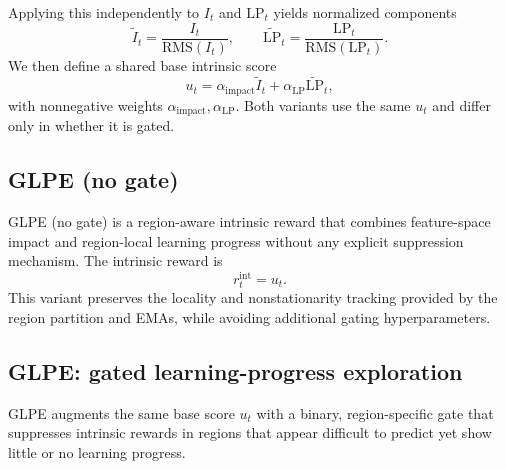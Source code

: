 Applying this independently to $I_t$ and $\mathrm{LP}_t$ yields normalized components
\begin{equation}
    \widetilde{I}_t = \frac{I_t}{\mathrm{RMS}(I_t)},\qquad
    \widetilde{\mathrm{LP}}_t = \frac{\mathrm{LP}_t}{\mathrm{RMS}(\mathrm{LP}_t)}.
\end{equation}
We then define a shared base intrinsic score
\begin{equation}
    u_t = \alpha_{\mathrm{impact}}\widetilde{I}_t + \alpha_{\mathrm{LP}}\widetilde{\mathrm{LP}}_t,
\end{equation}
with nonnegative weights $\alpha_{\mathrm{impact}},\alpha_{\mathrm{LP}}$.
Both variants use the same $u_t$ and differ only in whether it is gated.

\subsection{GLPE (no gate)}

GLPE (no gate) is a region-aware intrinsic reward that combines feature-space impact and region-local learning progress without any explicit suppression mechanism.
The intrinsic reward is
\begin{equation}
    r_t^{\mathrm{int}} = u_t.
\end{equation}
This variant preserves the locality and nonstationarity tracking provided by the region partition and EMAs, while avoiding additional gating hyperparameters.

\subsection{GLPE: gated learning-progress exploration}

GLPE augments the same base score $u_t$ with a binary, region-specific gate that suppresses intrinsic rewards in regions that appear difficult to predict yet show little or no learning progress.

